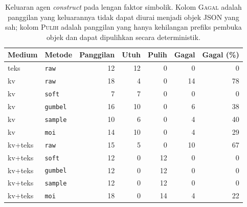 \begin{table}[htbp]
\centering
\caption{Keluaran agen \textit{construct} pada lengan faktor simbolik. Kolom \textsc{Gagal} adalah panggilan yang keluarannya tidak dapat diurai menjadi objek JSON yang sah; kolom \textsc{Pulih} adalah panggilan yang hanya kehilangan prefiks pembuka objek dan dapat dipulihkan secara deterministik.}
\label{tab:faktor-parsing}
\small
\begin{tabular}{llrrrrr}
\hline
Medium & Metode & Panggilan & Utuh & Pulih & Gagal & Gagal (\%) \\
\hline
teks & \texttt{raw} & 12 & 12 & 0 & 0 & 0 \\
kv & \texttt{raw} & 18 & 4 & 0 & 14 & 78 \\
kv & \texttt{soft} & 7 & 7 & 0 & 0 & 0 \\
kv & \texttt{gumbel} & 16 & 10 & 0 & 6 & 38 \\
kv & \texttt{sample} & 10 & 6 & 0 & 4 & 40 \\
kv & \texttt{moi} & 14 & 10 & 0 & 4 & 29 \\
kv+teks & \texttt{raw} & 15 & 5 & 0 & 10 & 67 \\
kv+teks & \texttt{soft} & 12 & 0 & 12 & 0 & 0 \\
kv+teks & \texttt{gumbel} & 12 & 0 & 12 & 0 & 0 \\
kv+teks & \texttt{sample} & 12 & 0 & 12 & 0 & 0 \\
kv+teks & \texttt{moi} & 18 & 0 & 14 & 4 & 22 \\
\hline
\end{tabular}
\end{table}
